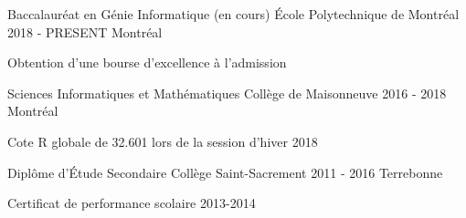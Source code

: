 \begin{cventries}
  \cventry
    {Baccalauréat en Génie Informatique (en cours)}
    {École Polytechnique de Montréal}
    {2018 - PRESENT}
    {Montréal}
    {
      \begin{cvitems}
        \item {Obtention d'une bourse d'excellence à l'admission}
      \end{cvitems}
    }
  \cventry
    {Sciences Informatiques et Mathématiques}
    {Collège de Maisonneuve}
    {2016 - 2018}
    {Montréal}
    {
        \begin{cvitems}
        \item {Cote R globale de 32.601 lors de la session d'hiver 2018}
        \end{cvitems}
    }
    
    \cventry
        {Diplôme d'Étude Secondaire}
        {Collège Saint-Sacrement}
        {2011 - 2016}
        {Terrebonne}
        {
            \begin{cvitems}
            \item {Certificat de performance scolaire 2013-2014}
            \end{cvitems}
        }
\end{cventries}
